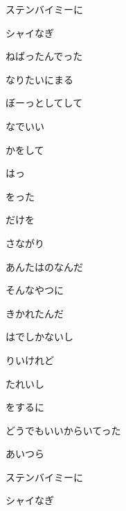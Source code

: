 \documentclass[a4paper,tate,twocolumn,12pt]{ltjtarticle}
\begin{document}
\begin{flushleft}
\begin{minipage}{\linewidth}
ステンバイミーに

シャイなぎ

ねばったんでった

なりたいにまる

ぼーっとしてして

なでいい
\end{minipage}

\vspace{2em}

\noindent\begin{minipage}{\linewidth}
かをして

はっ

をった

だけを


さながり

あんたはのなんだ

そんなやつに

きかれたんだ
\end{minipage}

\vspace{2em}

\noindent\begin{minipage}{\linewidth}
はでしかないし

りいけれど

たれいし

をするに
\end{minipage}

\vspace{2em}

\noindent\begin{minipage}{\linewidth}
どうでもいいからいてった

あいつら

ステンバイミーに

シャイなぎ


\end{minipage}
\end{flushleft}
\end{document}
